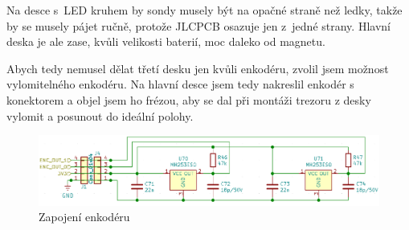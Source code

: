 Na desce s~LED kruhem by sondy musely být na opačné straně než ledky, takže by se musely pájet ručně, protože JLCPCB osazuje jen z~jedné strany. Hlavní deska je ale zase, 
kvůli velikosti baterií, moc daleko od magnetu. 

Abych tedy nemusel dělat třetí desku jen kvůli enkodéru, zvolil jsem možnost vylomitelného enkodéru. Na hlavní desce jsem tedy nakreslil 
enkodér s konektorem a objel jsem ho frézou, aby se dal při montáži trezoru z desky vylomit a posunout do ideální polohy.

\begin{figure}[htbp]
    \centering
    \includegraphics[width=\textwidth]{kapitoly/obrazky/E4/ir_motor_enkoder/enc.png}
    \caption{Zapojení enkodéru}
    \label{fig:E4-enkoder}
\end{figure}
